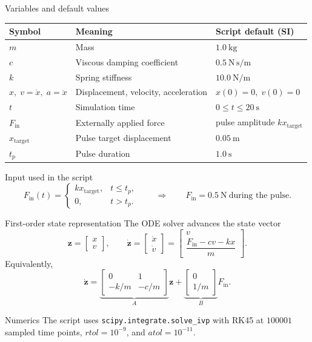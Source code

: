 \documentclass[aspectratio=169,10pt]{beamer}
\begin{document}
\begin{frame}{Variables and default values}
\small
\begin{tabular}{@{}lll@{}}
\toprule
Symbol & Meaning & Script default (SI) \\
\midrule
$m$ & Mass & $1.0\ \mathrm{kg}$ \\
$c$ & Viscous damping coefficient & $0.5\ \mathrm{N\,s/m}$ \\
$k$ & Spring stiffness & $10.0\ \mathrm{N/m}$ \\
$x,\;v=\dot{x},\;a=\ddot{x}$ & Displacement, velocity, acceleration & $x(0)=0,\;v(0)=0$ \\
$t$ & Simulation time & $0\leq t\leq20\ \mathrm{s}$ \\
$F_{\mathrm{in}}$ & Externally applied force & pulse amplitude $k x_{\mathrm{target}}$ \\
$x_{\mathrm{target}}$ & Pulse target displacement & $0.05\ \mathrm{m}$ \\
$t_p$ & Pulse duration & $1.0\ \mathrm{s}$ \\
\bottomrule
\end{tabular}
\vspace{1em}
\begin{alertblock}{Input used in the script}
\[
F_{\mathrm{in}}(t)=
\begin{cases}
kx_{\mathrm{target}}, & t\leq t_p,\\
0, & t>t_p.
\end{cases}
\qquad\Rightarrow\qquad F_{\mathrm{in}}=0.5\ \mathrm{N}\ \text{during the pulse.}
\]
\end{alertblock}
\end{frame}

\begin{frame}{First-order state representation}
The ODE solver advances the state vector
\[
\mathbf{z}=\begin{bmatrix}x\\v\end{bmatrix},
\qquad
\dot{\mathbf{z}}=
\begin{bmatrix}
\dot{x}\\\dot{v}
\end{bmatrix}
=
\begin{bmatrix}
v\\[0.25em]
\dfrac{F_{\mathrm{in}}-cv-kx}{m}
\end{bmatrix}.
\]
\vspace{0.6em}
Equivalently,
\[
\dot{\mathbf{z}}=
\underbrace{\begin{bmatrix}0&1\\-k/m&-c/m\end{bmatrix}}_{A}\mathbf{z}
+
\underbrace{\begin{bmatrix}0\\1/m\end{bmatrix}}_{B}F_{\mathrm{in}}.
\]
\begin{block}{Numerics}
The script uses \texttt{scipy.integrate.solve\_ivp} with RK45 at $100001$ sampled time points, $rtol=10^{-9}$, and $atol=10^{-11}$.
\end{block}
\end{frame}
\end{document}

